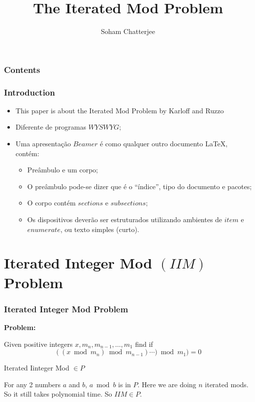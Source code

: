 \documentclass[article,10pt]{beamer}%
\title{The Iterated Mod Problem}
\author{\LARGE{Soham Chatterjee}}
\institute{\large{Chennai Mathematical Institute}}
\begin{document}
\maketitle


\begin{frame}
    \frametitle{Contents}
    \tableofcontents
\end{frame}



\begin{frame}
    \frametitle{Introduction}
\begin{itemize}
    \item This paper is about the Iterated Mod Problem by Karloff and Ruzzo \cite{iteratedmod}
    \item  Diferente de programas $WYSWYG$;
    \item  Uma apresentação $Beamer$ é como qualquer outro documento LaTeX, contém:
    \begin{itemize}
        \item Preâmbulo e um corpo;
        \item O preâmbulo pode-se dizer que é o ``índice'', tipo do documento e pacotes;
        \item O corpo contém $sections$ e $subsections$;
        \item Os dispositivos deverão ser estruturados utilizando ambientes de $item$ e $enumerate$, ou texto simples (curto).
\end{itemize} 
\end{itemize}
\end{frame}
\section{Iterated Integer Mod $(IIM)$ Problem}
\begin{frame}
	\frametitle{Iterated Integer Mod Problem}
	\textbf{Problem:}
	
		 Given positive integers $x, m_n,m_{n-1},\dots, m_1$  find if $$((x\bmod{m_{n}})\bmod{m_{n-1}})\cdots)\bmod{m_{1}})=0$$
\vspace{3mm}
		 \begin{theorem}
		Iterated Iinteger Mod $\in P$
	\end{theorem}
	For any 2 numbers $a$ and $b$, $a\bmod{b}$ is in $P$. Here we are doing $n$ iterated mods. So it still takes polynomial time. So $IIM\in P$.
\end{frame}
\end{document}
